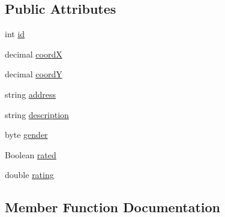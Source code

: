 \subsection*{Public Attributes}
\begin{DoxyCompactItemize}
\item 
int \hyperlink{class_shame_the_thrones_1_1_models_1_1_restroom_search_result_model_a108d2f8a6fd3da3a3768029a6f8ddad5}{id}
\item 
decimal \hyperlink{class_shame_the_thrones_1_1_models_1_1_restroom_search_result_model_aef4e7314621b7914087c19a0598a6280}{coordX}
\item 
decimal \hyperlink{class_shame_the_thrones_1_1_models_1_1_restroom_search_result_model_abc54eeae3b03618fc18c2719216779e8}{coordY}
\item 
string \hyperlink{class_shame_the_thrones_1_1_models_1_1_restroom_search_result_model_a24d51dbc0da40748367b0848452af3cd}{address}
\item 
string \hyperlink{class_shame_the_thrones_1_1_models_1_1_restroom_search_result_model_ac8235ceb902d762ff3c27c245a9f4340}{description}
\item 
byte \hyperlink{class_shame_the_thrones_1_1_models_1_1_restroom_search_result_model_a2a0ce3864fe11082857a8a8e81063618}{gender}
\item 
Boolean \hyperlink{class_shame_the_thrones_1_1_models_1_1_restroom_search_result_model_a7df672c3c5a1746b72468db0a97db7f5}{rated}
\item 
double \hyperlink{class_shame_the_thrones_1_1_models_1_1_restroom_search_result_model_ad6e9121e260b7c7ae8ddc5ca0a554742}{rating}
\end{DoxyCompactItemize}


\subsection{Member Function Documentation}
